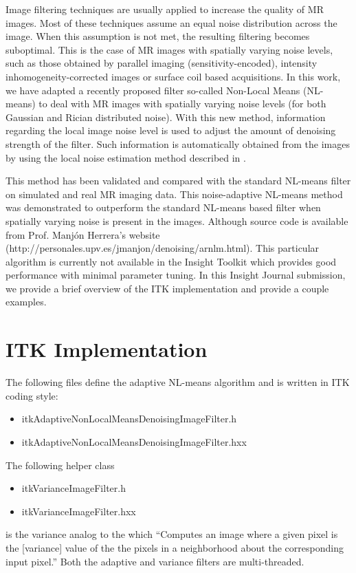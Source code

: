 \documentclass{InsightArticle}
\begin{document}
Image filtering techniques are usually applied to increase the quality of MR images.
Most of these techniques assume an equal noise distribution across the image. When this
assumption is not met, the resulting filtering becomes suboptimal. This is the case of MR
images with spatially varying noise levels, such as those obtained by parallel imaging
(sensitivity-encoded), intensity inhomogeneity-corrected images or surface coil based
acquisitions. In this work, we have adapted a recently proposed filter so-called
Non-Local Means (NL-means) to deal with MR images with spatially varying noise levels
(for both Gaussian and Rician distributed noise). With this new method, information
regarding the local image noise level is used to adjust the amount of denoising strength
of the filter. Such information is automatically obtained from the images by using the
local noise estimation method described in \cite{Manjon:2010aa}.

This method has been validated and compared with the standard NL-means filter on simulated
and real MR imaging data. This noise-adaptive NL-means method was demonstrated to outperform
the standard NL-means based filter when spatially varying noise is present in the images.
Although source code is available from Prof. Manj\'on Herrera's website
(http://personales.upv.es/jmanjon/denoising/arnlm.html).  This particular algorithm is
currently not available in the Insight Toolkit which provides good performance with minimal
parameter tuning. In this Insight Journal submission, we provide a brief overview of the ITK
implementation and provide a couple examples.

\section{ITK Implementation}

The following files define the adaptive NL-means algorithm and is written in ITK
coding style:
\begin{itemize}
  \item itkAdaptiveNonLocalMeansDenoisingImageFilter.h
  \item itkAdaptiveNonLocalMeansDenoisingImageFilter.hxx
\end{itemize}
The following helper class
\begin{itemize}
  \item itkVarianceImageFilter.h
  \item itkVarianceImageFilter.hxx
\end{itemize}
is the variance analog to the  which ``Computes an image where a
given pixel is the [variance] value of the the pixels in a neighborhood about the corresponding
input pixel.''  Both the adaptive and variance filters are multi-threaded.
\end{document}
